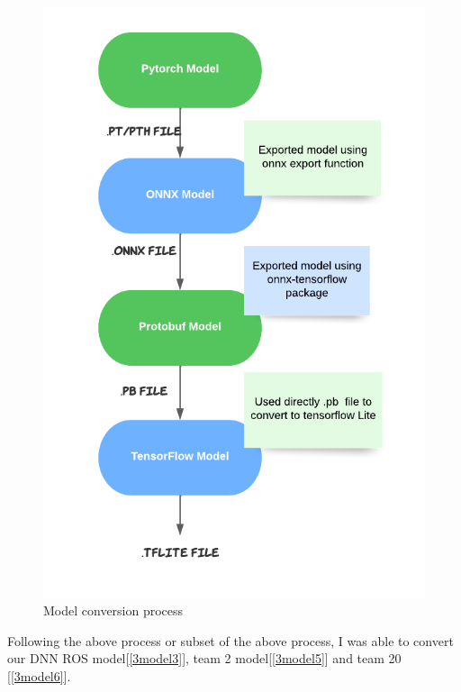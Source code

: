 \begin{figure}[H]
\centering
\includegraphics[scale=0.9]{img/model_conversion_process.png}
\caption{Model conversion process}
\label{fig:model_conversion_process}
\end{figure}


Following the above process or subset of the above process, I was able to convert our DNN ROS model[\ref{3model3}], team 2 model[\ref{3model5}] and team 20 [\ref{3model6}]. 
